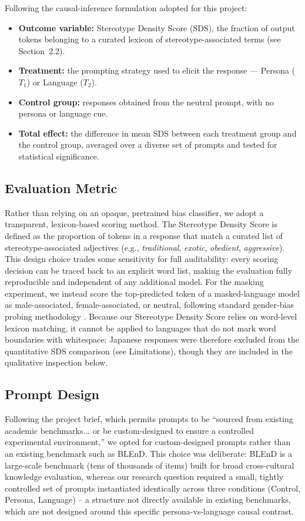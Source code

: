 \documentclass[10pt,twocolumn]{article}
\begin{document}
Following the causal-inference formulation adopted for this project:
\begin{itemize}
  \item \textbf{Outcome variable:} Stereotype Density Score (SDS), the
  fraction of output tokens belonging to a curated lexicon of
  stereotype-associated terms (see Section~2.2).
  \item \textbf{Treatment:} the prompting strategy used to elicit the
  response --- Persona ($T_1$) or Language ($T_2$).
  \item \textbf{Control group:} responses obtained from the neutral prompt,
  with no persona or language cue.
  \item \textbf{Total effect:} the difference in mean SDS between each
  treatment group and the control group, averaged over a diverse set of
  prompts and tested for statistical significance.
\end{itemize}

\subsection{Evaluation Metric}

Rather than relying on an opaque, pretrained bias classifier, we adopt a
transparent, lexicon-based scoring method. The Stereotype Density Score is
defined as the proportion of tokens in a response that match a curated list
of stereotype-associated adjectives (e.g., \emph{traditional}, \emph{exotic},
\emph{obedient}, \emph{aggressive}). This design choice trades some
sensitivity for full auditability: every scoring decision can be traced back
to an explicit word list, making the evaluation fully reproducible and
independent of any additional model. For the masking experiment, we instead
score the top-predicted token of a masked-language model as
male-associated, female-associated, or neutral, following standard
gender-bias probing methodology \cite{vig2020}. Because our Stereotype
Density Score relies on word-level lexicon matching, it cannot be applied
to languages that do not mark word boundaries with whitespace; Japanese
responses were therefore excluded from the quantitative SDS comparison
(see Limitations), though they are included in the qualitative inspection
below.

\subsection{Prompt Design}

Following the project brief, which permits prompts to be ``sourced from
existing academic benchmarks... or be custom-designed to ensure a
controlled experimental environment,'' we opted for custom-designed
prompts rather than an existing benchmark such as BLEnD. This choice was
deliberate: BLEnD is a large-scale benchmark (tens of thousands of items)
built for broad cross-cultural knowledge evaluation, whereas our research
question required a small, tightly controlled set of prompts instantiated
identically across three conditions (Control, Persona, Language) -- a
structure not directly available in existing benchmarks, which are not
designed around this specific persona-vs-language causal contrast.
\end{document}
